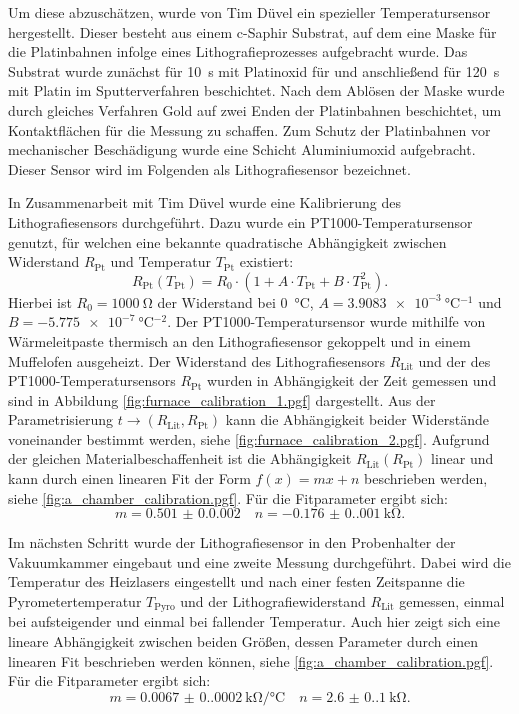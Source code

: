 Um diese abzuschätzen, wurde von Tim Düvel ein spezieller Temperatursensor hergestellt.
Dieser besteht aus einem c-Saphir Substrat, auf dem eine Maske für die Platinbahnen infolge eines
Lithografieprozesses aufgebracht wurde.
Das Substrat wurde zunächst für \qty{10}{\second} mit Platinoxid für und anschließend für \qty{120}{\second} mit Platin
im Sputterverfahren beschichtet.
Nach dem Ablösen der Maske wurde durch gleiches Verfahren Gold auf zwei Enden der Platinbahnen beschichtet, um
Kontaktflächen für die Messung zu schaffen.
Zum Schutz der Platinbahnen vor mechanischer Beschädigung wurde eine Schicht Aluminiumoxid aufgebracht.
Dieser Sensor wird im Folgenden als Lithografiesensor bezeichnet.

In Zusammenarbeit mit Tim Düvel wurde eine Kalibrierung des Lithografiesensors durchgeführt.
Dazu wurde ein PT1000-Temperatursensor genutzt, für welchen eine bekannte quadratische Abhängigkeit zwischen Widerstand
$R_{\mathrm{Pt}}$ und Temperatur $T_{\mathrm{Pt}}$ existiert\autocite{din_pt}:
\begin{equation}
    R_{\mathrm{Pt}}(T_{\mathrm{Pt}})
    =R_0 \cdot (1 + A \cdot T_{\mathrm{Pt}} + B \cdot T_{\mathrm{Pt}}^2).
    \label{eq:pt1000_calibration}
\end{equation}
Hierbei ist $R_0 = \qty{1000}{\ohm}$ der Widerstand bei \qty{0}{\degreeCelsius},
$A = \qty{3.9083e-3}{\degreeCelsius^{-1}}$ und $B = \qty{-5.775e-7}{\degreeCelsius^{-2}}$.
Der PT1000-Temperatursensor wurde mithilfe von Wärmeleitpaste thermisch an den Lithografiesensor gekoppelt und
in einem Muffelofen ausgeheizt.
Der Widerstand des Lithografiesensors $R_\mathrm{Lit}$ und der des PT1000-Temperatursensors $R_\mathrm{Pt}$
wurden in Abhängigkeit der Zeit gemessen und sind in Abbildung \cref{fig:furnace_calibration_1.pgf} dargestellt.
Aus der Parametrisierung $t \to (R_\mathrm{Lit}, R_\mathrm{Pt})$ kann die Abhängigkeit beider Widerstände voneinander
bestimmt werden, siehe \cref{fig:furnace_calibration_2.pgf}.
Aufgrund der gleichen Materialbeschaffenheit ist die Abhängigkeit $R_\mathrm{Lit}(R_\mathrm{Pt})$ linear und kann durch
einen linearen Fit der Form $f(x)=mx+n$ beschrieben werden, siehe \cref{fig:a_chamber_calibration.pgf}.
Für die Fitparameter ergibt sich:
\begin{equation*}
    m = \num{0.501(0.0002)} \quad n = \qty{-0.176(0.001)}{\kilo\ohm}.
\end{equation*}

Im nächsten Schritt wurde der Lithografiesensor in den Probenhalter der Vakuumkammer eingebaut und eine
zweite Messung durchgeführt.
Dabei wird die Temperatur des Heizlasers eingestellt und nach einer festen Zeitspanne die Pyrometertemperatur
$T_\mathrm{Pyro}$ und der Lithografiewiderstand $R_\mathrm{Lit}$ gemessen, einmal bei aufsteigender und einmal bei
fallender Temperatur.
Auch hier zeigt sich eine lineare Abhängigkeit zwischen beiden Größen, dessen Parameter durch einen linearen Fit
beschrieben werden können, siehe \cref{fig:a_chamber_calibration.pgf}.
Für die Fitparameter ergibt sich:
\begin{equation*}
    m = \qty{0.0067(0.0002)}{\kilo\ohm\per\degreeCelsius} \quad n = \qty{2.6(0.1)}{\kilo\ohm}.
\end{equation*}

